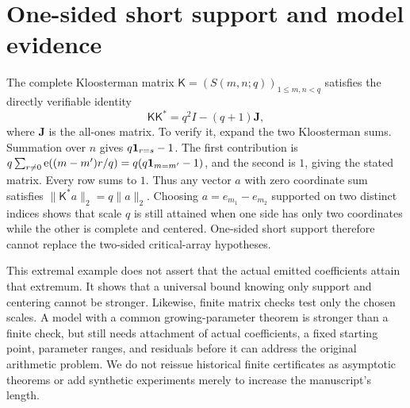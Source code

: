 \section{One-sided short support and model evidence}\label{sec:models}
The complete Kloosterman matrix $\mathsf K=(S(m,n;q))_{1\le m,n<q}$ satisfies the directly verifiable identity
\[
\mathsf K\mathsf K^*=q^2I-(q+1)\mathbf J,
\]
where $\mathbf J$ is the all-ones matrix. To verify it, expand the two Kloosterman sums. Summation over $n$ gives $q\mathbf 1_{r=s}-1$.
The first contribution is
$q\sum_{r\ne0}\mathrm e((m-m')r/q)=q(q\mathbf 1_{m=m'}-1)$, and the second is $1$, giving the stated matrix. Every row sums to $1$.
Thus any vector $a$ with zero coordinate sum satisfies $\|\mathsf K^*a\|_2=q\|a\|_2$.
Choosing $a=e_{m_1}-e_{m_2}$ supported on two distinct indices shows that scale $q$ is still attained when one side has only two coordinates while the other is complete and centered.
One-sided short support therefore cannot replace the two-sided critical-array hypotheses.

This extremal example does not assert that the actual emitted coefficients attain that extremum.
It shows that a universal bound knowing only support and centering cannot be stronger.
Likewise, finite matrix checks test only the chosen scales. A model with a common growing-parameter theorem is stronger than a finite check, but still needs attachment of actual coefficients, a fixed starting point, parameter ranges, and residuals before it can address the original arithmetic problem.
We do not reissue historical finite certificates as asymptotic theorems or add synthetic experiments merely to increase the manuscript's length.
